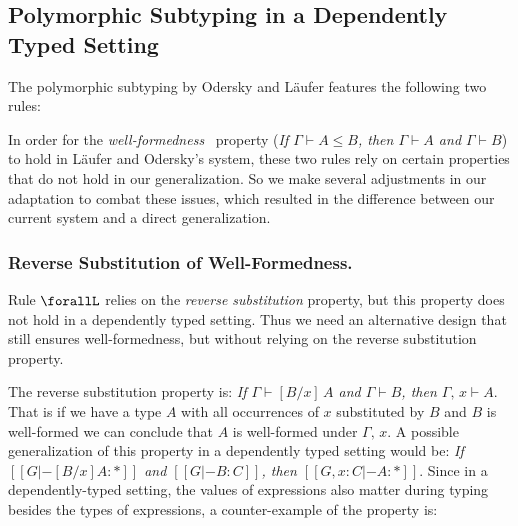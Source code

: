 \subsection{Polymorphic Subtyping in a Dependently Typed Setting}
\label{sec:adaptation}

The polymorphic subtyping by Odersky and L\"aufer features the following two rules:


In order for the \emph{well-formedness}~\cite{dunfield2013lemmas} property
(\emph{If $\Gamma \vdash A \le B$, then $\Gamma \vdash A$ and $\Gamma \vdash B$})
to hold in L\"aufer and Odersky's system, these two rules rely on certain properties
that do not hold in our generalization. So we make several adjustments
in our adaptation to combat these issues, which resulted in the difference between
our current system and a direct generalization.

\subsubsection{Reverse Substitution of Well-Formedness.}
Rule $\forallL$ relies on the \emph{reverse substitution} property, but this property
does not hold in a dependently typed setting. Thus we need an alternative design that
still ensures well-formedness, but without relying on the reverse substitution property.

The reverse substitution property is:
\emph{If $\Gamma \vdash [B / x] \, A$ and $\Gamma \vdash B$, then $\Gamma,\, x \vdash A$}.
That is if we have a type $A$ with all occurrences of $x$ substituted by $B$ and $B$
is well-formed we can conclude that $A$ is well-formed under $\Gamma,\, x$.
A possible generalization of this property in a dependently typed setting would be:
\emph{If $[[G |- [B / x] A : *]]$ and $[[G |- B : C]]$, then $[[G , x : C |- A : *]]$}.
Since in a dependently-typed setting, the values of expressions also matter during typing
besides the types of expressions, a counter-example of the property is:

